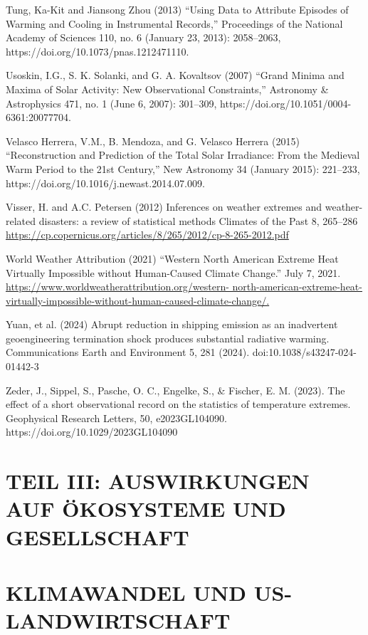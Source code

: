 \documentclass[12pt,paper=a4,DIV=12,parskip=never,chapterprefix=false,headings=standardclasses]{scrreprt}
\newcommand{\FigureNumbersByChapter}{%
  \counterwithout{figure}{section}%
  \counterwithin{figure}{chapter}%
}
\begin{document}
Tung, Ka-Kit and Jiansong Zhou (2013) “Using Data to Attribute Episodes of Warming and Cooling in
Instrumental Records,” Proceedings of the National Academy of Sciences 110, no. 6 (January 23,
2013): 2058–2063, https://doi.org/10.1073/pnas.1212471110.

Usoskin, I.G., S. K. Solanki, and G. A. Kovaltsov (2007) “Grand Minima and Maxima of Solar Activity:
New Observational Constraints,” Astronomy \& Astrophysics 471, no. 1 (June 6, 2007): 301–309,
https://doi.org/10.1051/0004-6361:20077704.

Velasco Herrera, V.M., B. Mendoza, and G. Velasco Herrera (2015) “Reconstruction and Prediction of
the Total Solar Irradiance: From the Medieval Warm Period to the 21st Century,” New Astronomy 34
(January 2015): 221–233, https://doi.org/10.1016/j.newast.2014.07.009.

Visser, H. and A.C. Petersen (2012) Inferences on weather extremes and weather-related disasters: a
review of statistical methods Climates of the Past 8, 265–286
\url{https://cp.copernicus.org/articles/8/265/2012/cp-8-265-2012.pdf}

World Weather Attribution (2021) “Western North American Extreme Heat Virtually Impossible without
Human-Caused Climate Change.” July 7, 2021. \url{https://www.worldweatherattribution.org/western-
north-american-extreme-heat-virtually-impossible-without-human-caused-climate-change/.}

Yuan, et al. (2024) Abrupt reduction in shipping emission as an inadvertent geoengineering termination
shock produces substantial radiative warming. Communications Earth and Environment 5, 281
(2024). doi:10.1038/s43247-024-01442-3

Zeder, J., Sippel, S., Pasche, O. C., Engelke, S., \& Fischer, E. M. (2023). The effect of a short
observational record on the statistics of temperature extremes. Geophysical Research Letters, 50,
e2023GL104090. https://doi.org/10.1029/2023GL104090
\endgroup


\cleardoublepage
\chapter*{TEIL III: AUSWIRKUNGEN AUF ÖKOSYSTEME UND GESELLSCHAFT}
\FigureNumbersByChapter
{}
\cleardoublepage
\chapter{KLIMAWANDEL UND US-LANDWIRTSCHAFT}
\end{document}
